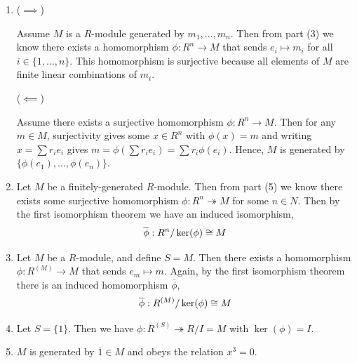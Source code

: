 \documentclass[Notebook.tex]{subfiles}
\begin{document}
\begin{solution}
\begin{enumerate}
            \item ($\implies$) 
            
            Assume $M$ is a $R$-module generated by $m_1, \ldots, m_n$. Then from part (3) we know there exists a homomorphism $\phi: R^n \to M$ that sends $e_i \mapsto m_i$ for all $i \in \{1, \ldots, n\}$. This homomorphism is surjective because all elements of $M$ are finite linear combinations of $m_i$. 
            
            ($\impliedby$)

            Assume there exists a surjective homomorphism $\phi: R^n \to M$. Then for any $m \in M$, surjectivity gives some $x \in R^n$ with $\phi(x) = m$ and writing $x = \sum r_i e_i$ gives $m = \phi(\sum r_i e_i) = \sum r_i \phi(e_i)$. Hence, $M$ is generated by $\{\phi(e_1), \ldots, \phi(e_n)\}$. 

            \item Let $M$ be a finitely-generated $R$-module. Then from part (5) we know there exists some surjective homomorphism $\phi: R^n \twoheadrightarrow M$ for some $n \in N$. Then by the first isomorphism theorem we have an induced isomorphism, 
            \[\overline{\phi}: R^n / \ker(\phi) \cong M\]

            \item Let $M$ be a $R$-module, and define $S = M$. Then there exists a homomorphism $\phi: R^{(M)} \to M$ that sends $e_m \mapsto m$. Again, by the first isomorphism theorem there is an induced homomorphism $\overline{\phi}$, 
            \[\overline{\phi}: R^{(M)} / \ker(\phi) \cong M\]

            \item Let $S = \{1\}$. Then we have $\phi: R^{(S)} \twoheadrightarrow R / I = M$ with $\ker(\phi) = I$. 
            
            \item $M$ is generated by $\overline{1} \in M$ and obeys the relation $x^3 = 0$. 
        \end{enumerate}    
    \end{solution}


    \newpage
    
\end{document}
